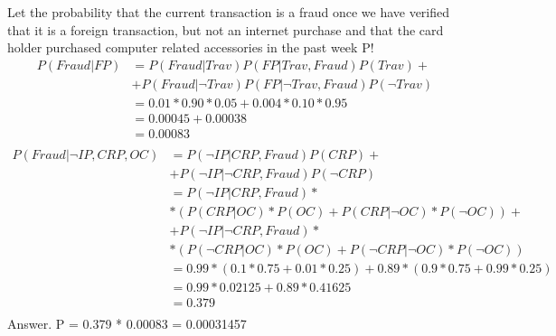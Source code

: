 \documentclass[12pt]{article}
\newenvironment{problem}[2][Problem]{\begin{trivlist}
\item[\hskip \labelsep {\bfseries #1}\hskip \labelsep {\bfseries #2.}]}{\end{trivlist}}
\begin{document}
\begin{problem}{3}
Let the probability that the current transaction is a fraud once we have verified that it is a foreign
transaction, but not an internet purchase and that the card holder purchased computer related accessories
in the past week P!
			 \begin{align*}
				P(Fraud|FP)
				&=P(Fraud |Trav) P(FP|Trav,Fraud) P(Trav) +\\
				&+ P(Fraud|\neg Trav)P(FP|\neg Trav, Fraud)P(\neg Trav)\\
				&=0.01 *0.90 *0.05 + 0.004* 0.10* 0.95\\
				&=0.00045 + 0.00038\\
				&=0.00083\\
			\end{align*}
			 \begin{align*}
				P(Fraud|\neg IP,CRP, OC)
				&= P(\neg IP|CRP,Fraud) P(CRP) +\\
				&+ P(\neg IP|\neg CRP,Fraud)P(\neg CRP)\\
				&= P(\neg IP|CRP,Fraud)*\\
				&*(P(CRP|OC)*P(OC) + P(CRP|\neg OC)*P(\neg OC))+\\
				&+ P(\neg IP|\neg CRP,Fraud)*\\
				&*(P(\neg CRP|OC)*P(OC) + P(\neg CRP|\neg OC)*P(\neg OC))\\
				&=0.99*(0.1*0.75+0.01*0.25)+0.89*(0.9*0.75+0.99*0.25)\\
				&=0.99*0.02125+0.89*0.41625\\
				&=0.379\\
			\end{align*}
Answer. P = 0.379 * 0.00083 = 0.00031457
\end{problem}
\end{document}
